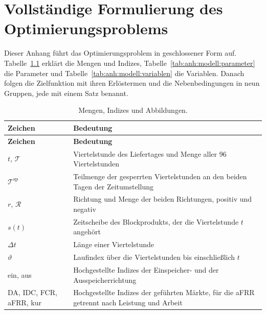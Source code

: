 \chapter{Vollständige Formulierung des Optimierungsproblems}
\label{anh:modell}

Dieser Anhang führt das Optimierungsproblem in geschlossener Form auf.
Tabelle~\ref{tab:anh:modell:mengen} erklärt die Mengen und Indizes, Tabelle~\ref{tab:anh:modell:parameter} die Parameter und Tabelle~\ref{tab:anh:modell:variablen} die Variablen.
Danach folgen die Zielfunktion mit ihren Erlöstermen und die Nebenbedingungen in neun Gruppen, jede mit einem Satz benannt.

{\footnotesize\renewcommand{\arraystretch}{1.15}
\begin{longtable}{@{}>{\raggedright\arraybackslash}p{}>{\raggedright\arraybackslash}p{}@{}}
    \caption{Mengen, Indizes und Abbildungen.}\label{tab:anh:modell:mengen}\\
    \hline
    \textbf{Zeichen} & \textbf{Bedeutung} \\
    \hline
    \endfirsthead
    \hline
    \textbf{Zeichen} & \textbf{Bedeutung} \\
    \hline
    \endhead
        $t$, $\mathcal{T}$ & Viertelstunde des Liefertages und Menge aller 96 Viertelstunden \\
        \hline
        $\mathcal{T}^{\mathrm{sp}}$ & Teilmenge der gesperrten Viertelstunden an den beiden Tagen der Zeitumstellung \\
        \hline
        $r$, $\mathcal{R}$ & Richtung und Menge der beiden Richtungen, positiv und negativ \\
        \hline
        $s(t)$ & Zeitscheibe des Blockprodukts, der die Viertelstunde $t$ angehört \\
        \hline
        $\Delta t$ & Länge einer Viertelstunde \\
        \hline
        $\vartheta$ & Laufindex über die Viertelstunden bis einschließlich $t$ \\
        \hline
        ein, aus & Hochgestellte Indizes der Einspeicher- und der Ausspeicherrichtung \\
        \hline
        \acs{DA}, \acs{IDC}, \acs{FCR}, \acs{aFRR}, kur & Hochgestellte Indizes der geführten Märkte, für die \acs{aFRR} getrennt nach Leistung und Arbeit \\
        \hline
\end{longtable}}

